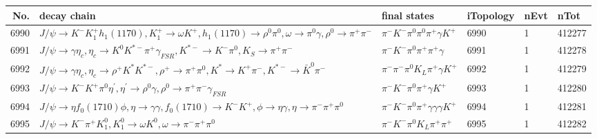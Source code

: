 \begin{table}[htbp] 
\begin{center}
\begin{small}
\begin{tabular}{rlllll}\hline\hline
 No. & decay chain & final states &  iTopology & nEvt & nTot \\\hline
6990&$J/\psi       \rightarrow K^{-}          K_1^{+}        h_{1}(1170)    , K_1^{+}         \rightarrow \omega         K^{+}          , h_{1}(1170)     \rightarrow \rho^{0}      \pi^{0}        , \omega          \rightarrow \pi^{0}        \gamma       , \rho^{0}       \rightarrow \pi^{+}        \pi^{-}        $&$\pi^{-}        K^{-}          \pi^{0}        \pi^{0}        \pi^{+}        \gamma       K^{+}          $& 6990&    1&412277\\
6991&$J/\psi       \rightarrow \gamma       \eta_{c}    , \eta_{c}     \rightarrow K^{0}          K^{*-}         \pi^{+}        \gamma_{FSR} , K^{*-}          \rightarrow K^{-}          \pi^{0}        , K_{S}           \rightarrow \pi^{+}        \pi^{-}        $&$\pi^{-}        K^{-}          \pi^{0}        \pi^{+}        \pi^{+}        \gamma       $& 6991&    1&412278\\
6992&$J/\psi       \rightarrow \gamma       \eta_{c}    , \eta_{c}     \rightarrow \rho^{+}      K^{*}          K^{*-}         , \rho^{+}       \rightarrow \pi^{+}        \pi^{0}        , K^{*}           \rightarrow K^{+}          \pi^{-}        , K^{*-}          \rightarrow \bar{K}^{0}   \pi^{-}        $&$\pi^{-}        \pi^{-}        \pi^{0}        K_{L}          \pi^{+}        \gamma       K^{+}          $& 6992&    1&412279\\
6993&$J/\psi       \rightarrow K^{-}          K^{+}          \pi^{0}        \eta^{\prime} , \eta^{\prime}  \rightarrow \rho^{0}      \gamma       , \rho^{0}       \rightarrow \pi^{+}        \pi^{-}        \gamma_{FSR} $&$\pi^{-}        K^{-}          \pi^{0}        \pi^{+}        \gamma       K^{+}          $& 6993&    1&412280\\
6994&$J/\psi       \rightarrow \eta          f_{0}(1710)    \phi           , \eta           \rightarrow \gamma       \gamma       , f_{0}(1710)     \rightarrow K^{-}          K^{+}          , \phi            \rightarrow \eta          \gamma       , \eta           \rightarrow \pi^{-}        \pi^{+}        \pi^{0}        $&$\pi^{-}        K^{-}          \pi^{0}        \pi^{+}        \gamma       \gamma       \gamma       K^{+}          $& 6994&    1&412281\\
6995&$J/\psi       \rightarrow K^{-}          \pi^{+}        K_1^{0}        , K_1^{0}         \rightarrow \omega         K^{0}          , \omega          \rightarrow \pi^{-}        \pi^{+}        \pi^{0}        $&$\pi^{-}        K^{-}          \pi^{0}        K_{L}          \pi^{+}        \pi^{+}        $& 6995&    1&412282\\

\end{tabular}
\end{small}
\end{center}
\end{table}
